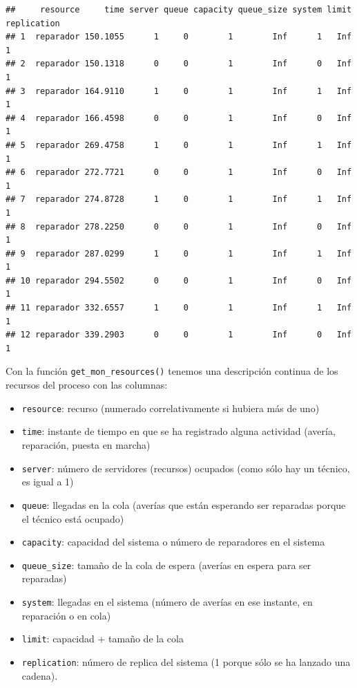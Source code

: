 \documentclass[
]{book}
\providecommand{\tightlist}{%
  \setlength{\itemsep}{0pt}\setlength{\parskip}{0pt}}
\theoremstyle{definition}
\theoremstyle{definition}
\theoremstyle{definition}
\theoremstyle{definition}
\theoremstyle{remark}
\begin{document}
\begin{verbatim}
##     resource     time server queue capacity queue_size system limit replication
## 1  reparador 150.1055      1     0        1        Inf      1   Inf           1
## 2  reparador 150.1318      0     0        1        Inf      0   Inf           1
## 3  reparador 164.9110      1     0        1        Inf      1   Inf           1
## 4  reparador 166.4598      0     0        1        Inf      0   Inf           1
## 5  reparador 269.4758      1     0        1        Inf      1   Inf           1
## 6  reparador 272.7721      0     0        1        Inf      0   Inf           1
## 7  reparador 274.8728      1     0        1        Inf      1   Inf           1
## 8  reparador 278.2250      0     0        1        Inf      0   Inf           1
## 9  reparador 287.0299      1     0        1        Inf      1   Inf           1
## 10 reparador 294.5502      0     0        1        Inf      0   Inf           1
## 11 reparador 332.6557      1     0        1        Inf      1   Inf           1
## 12 reparador 339.2903      0     0        1        Inf      0   Inf           1
\end{verbatim}

Con la función \texttt{get\_mon\_resources()} tenemos una descripción continua de los recursos del proceso con las columnas:

\begin{itemize}
\tightlist
\item
  \texttt{resource}: recurso (numerado correlativamente si hubiera más de uno)
\item
  \texttt{time}: instante de tiempo en que se ha registrado alguna actividad (avería, reparación, puesta en marcha)
\item
  \texttt{server}: número de servidores (recursos) ocupados (como sólo hay un técnico, es igual a 1)
\item
  \texttt{queue}: llegadas en la cola (averías que están esperando ser reparadas porque el técnico está ocupado)
\item
  \texttt{capacity}: capacidad del sistema o número de reparadores en el sistema
\item
  \texttt{queue\_size}: tamaño de la cola de espera (averías en espera para ser reparadas)
\item
  \texttt{system}: llegadas en el sistema (número de averías en ese instante, en reparación o en cola)
\item
  \texttt{limit}: capacidad + tamaño de la cola
\item
  \texttt{replication}: número de replica del sistema (1 porque sólo se ha lanzado una cadena).
\end{itemize}
\end{document}
